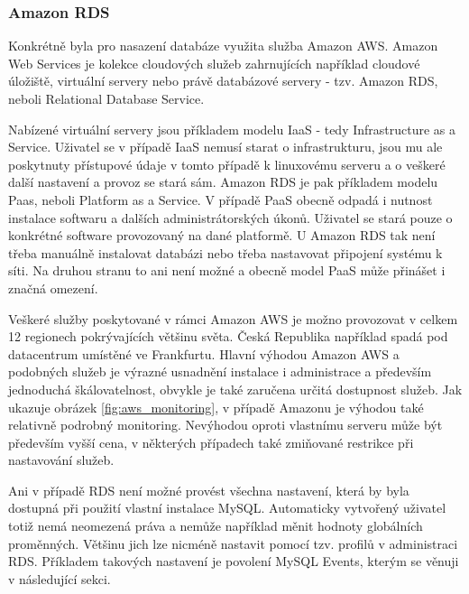 \documentclass[thesis=B,czech]{FITthesis}[2012/06/26]
\begin{document}
\subsubsection{Amazon RDS}
\label{amazon-aws}
	Konkrétně byla pro nasazení databáze využita služba Amazon AWS\cite{gghjjkk}. Amazon Web Services je kolekce cloudových služeb zahrnujících například cloudové úložiště, virtuální servery nebo právě databázové servery - tzv. Amazon RDS, neboli Relational Database Service. 
	
	Nabízené virtuální servery jsou příkladem modelu IaaS - tedy Infrastructure as a Service. Uživatel se v případě IaaS nemusí starat o infrastrukturu, jsou mu ale poskytnuty přístupové údaje v tomto případě k linuxovému serveru a o veškeré další nastavení a provoz se stará sám. Amazon RDS je pak příkladem modelu Paas, neboli Platform as a Service. V případě PaaS obecně odpadá i nutnost instalace softwaru a dalších administrátorských úkonů. Uživatel se stará pouze o konkrétné software provozovaný na dané platformě. U Amazon RDS tak není třeba manuálně instalovat databázi nebo třeba nastavovat připojení systému k síti. Na druhou stranu to ani není možné a obecně model PaaS může přinášet i značná omezení. 
	
	Veškeré služby poskytované v rámci Amazon AWS je možno provozovat v celkem 12 regionech pokrývajících většinu světa. Česká Republika například spadá pod datacentrum umístěné ve Frankfurtu. Hlavní výhodou Amazon AWS a podobných služeb je výrazné usnadnění instalace i administrace a především jednoduchá škálovatelnost, obvykle je také zaručena určitá dostupnost služeb. Jak ukazuje obrázek \ref{fig:aws_monitoring}, v případě Amazonu je výhodou také relativně podrobný monitoring. Nevýhodou oproti vlastnímu serveru může být především vyšší cena, v některých případech také zmiňované restrikce při nastavování služeb. 
	
	Ani v případě RDS není možné provést všechna nastavení, která by byla dostupná při použití vlastní instalace MySQL. Automaticky vytvořený uživatel totiž nemá neomezená práva a nemůže například měnit hodnoty globálních proměnných. Většinu jich lze nicméně nastavit pomocí tzv. profilů v administraci RDS. Příkladem takových nastavení je povolení MySQL Events, kterým se věnuji v následující sekci. 
\end{document}
